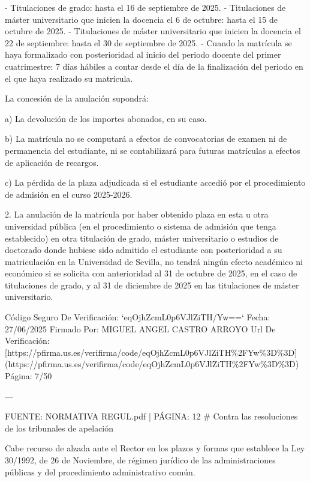 \documentclass{article}
\begin{document}
\begin{itemize}
\begin{itemize}
\begin{scriptsize}
                  - Titulaciones de grado: hasta el 16 de septiembre de 2025.
                  - Titulaciones de máster universitario que inicien la docencia el 6 de octubre: hasta el 15 de octubre de 2025.
                  - Titulaciones de máster universitario que inicien la docencia el 22 de septiembre: hasta el 30 de septiembre de 2025.
                  - Cuando la matrícula se haya formalizado con posterioridad al inicio del periodo docente del primer cuatrimestre: 7 días hábiles a contar desde el día de la finalización del periodo en el que haya realizado su matrícula.

                  La concesión de la anulación supondrá:

                  a) La devolución de los importes abonados, en su caso.

                  b) La matrícula no se computará a efectos de convocatorias de examen ni de permanencia del estudiante, ni se contabilizará para futuras matrículas a efectos de aplicación de recargos.

                  c) La pérdida de la plaza adjudicada si el estudiante accedió por el procedimiento de admisión en el curso 2025-2026.

                  2. La anulación de la matrícula por haber obtenido plaza en esta u otra universidad pública (en el procedimiento o sistema de admisión que tenga establecido) en otra titulación de grado, máster universitario o estudios de doctorado donde hubiese sido admitido el estudiante con posterioridad a su matriculación en la Universidad de Sevilla, no tendrá ningún efecto académico ni económico si se solicita con anterioridad al 31 de octubre de 2025, en el caso de titulaciones de grado, y al 31 de diciembre de 2025 en las titulaciones de máster universitario.

                  Código Seguro De Verificación: `eqOjhZcmL0p6VJlZiTH/Yw==`
                  Fecha: 27/06/2025
                  Firmado Por: MIGUEL ANGEL CASTRO ARROYO
                  Url De Verificación: [https://pfirma.us.es/verifirma/code/eqOjhZcmL0p6VJlZiTH\%2FYw\%3D\%3D](https://pfirma.us.es/verifirma/code/eqOjhZcmL0p6VJlZiTH\%2FYw\%3D\%3D)
                  Página: 7/50

                  ---

                  FUENTE: NORMATIVA REGUL.pdf | PÁGINA: 12
                  \# Contra las resoluciones de los tribunales de apelación

                  Cabe recurso de alzada ante el Rector en los plazos y formas que establece la Ley 30/1992, de 26 de Noviembre, de régimen jurídico de las administraciones públicas y del procedimiento administrativo común.


\end{scriptsize}
\end{itemize}
\end{itemize}
\end{document}
